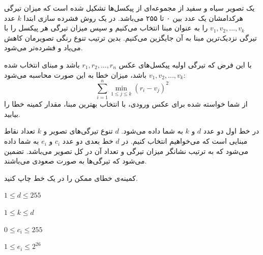\documentclass[11.5pt,a4paper,oneside]{article}
\begin{document}
\def\problemCode{Compression}
\def\problemEnglishTitle{Image Compression}
\def\problemFarsiTitle{فشرده‌سازی تصویر}
\def\timeLimit{$2$ \second}
\def\memLimit{$256$ \megabytes}
\begin{problem}
یک تصویر سیاه و سفید از مجموعه‌ای از پیکسل‌ها تشکیل شده است که میزان تیرگی هرکدامشان یک عدد بین ۰ تا ۲۵۵ می‌باشد. در یک روش فشرده سازی ابتدا $k$ عدد
$v_1, v_2, ..., v_k$
را به عنوان مبنا انتخاب می‌کنیم و سپس میزان تیرگی هر پیکسل را با تیرگی نزدیک‌ترین مبنا به آن جایگزین می‌کنیم. بدین ترتیب تنوع رنگی تصویرمان کاهش می‌یاد و فشرده‌تر می‌شود. 

با این فرض که تیرگی اولیه پیکسل‌های عکس
$r_1, r_2, ..., r_n$
باشد و مبنای انتخاب شده $v_1, v_2, ..., v_k$ باشد، میزان خطا به این صورت محاسبه می‌شود:
$$ \sum _{i=1}^ n \min _{1\leq j \leq k} (r_ i - v_ j)^2$$
از شما خواسته شده برای عکس ورودی، با انتخاب بهترین مبنا، مقدار کمینه خطا را بیابید.

در خط اول دو عدد $d$ و $k$ به شما داده می‌شود. $d$ تنوع تیرگی‌های تصویر و $k$ تعداد نقاط مبنایی است که می‌خواهیم انتخاب کنیم. در $d$
خط بعدی دو عدد $c_i$ و $e_i$
به شما داده می‌شود که به ترتیب نشانگر میزان تیرگی و تعداد آن در کل تصویر می‌باشد. تضمین می‌شود که تیرگی‌ها به صورت صعودی می‌باشند. 

\outputDescription
کمینه‌ی خطای ممکن را در یک خط چاپ کنید.

\constraints
\begin{shortitems}
	\item $1 \le d \le 255$
	\item $1 \le k \le d$
	\item $0 \le c_i \le 255$
	\item $1 \le e_i \le 2^{26}$
\end{shortitems}

\begin{example}
%
%
%
\end{example}

\end{problem}
\end{document}
